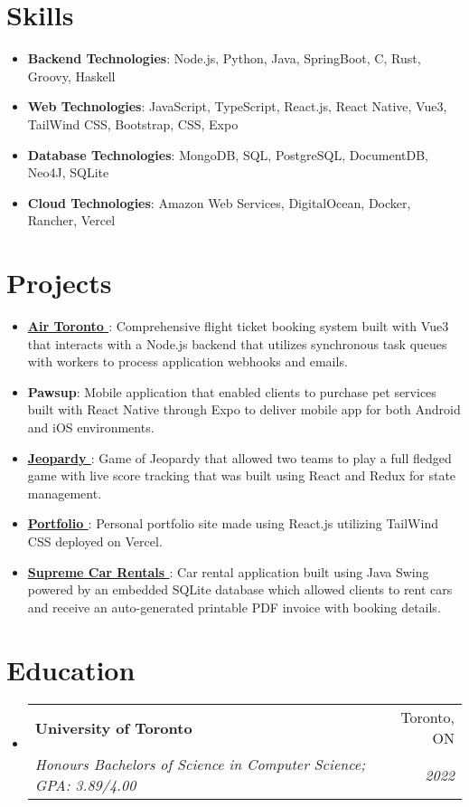 \documentclass[letterpaper,11pt]{article}
\makeatletter
\newcommand{\resumeItem}[2]{
  \item\small{
    \textbf{#1}{: #2 \vspace{0pt}}
  }
}
\newcommand{\resumeSubheading}[4]{
  \vspace{-1pt}\item
    \begin{tabular*}{0.97\textwidth}{l@{\extracolsep{\fill}}r}
      \textbf{#1} & #2 \\
      \textit{\small#3} & \textit{\small #4} \\
    \end{tabular*}\vspace{-2pt}
}
\newcommand{\resumeSubItem}[2]{\resumeItem{#1}{#2}\vspace{-2pt}}
\newcommand{\resumeSubHeadingListStart}{\begin{itemize}[leftmargin=*]}
\newcommand{\resumeSubHeadingListEnd}{\end{itemize}}
\makeatother
\begin{document}
\section{Skills}
 \resumeSubHeadingListStart
 	\resumeSubItem{Backend Technologies}{Node.js, Python, Java, SpringBoot, C, Rust, Groovy, Haskell}
 	\resumeSubItem{Web Technologies}{JavaScript, TypeScript, React.js, React Native, Vue3, TailWind CSS, Bootstrap, CSS, Expo }
 	\resumeSubItem{Database Technologies}{MongoDB, SQL, PostgreSQL, DocumentDB, Neo4J, SQLite}
 	\resumeSubItem{Cloud Technologies}{Amazon Web Services, DigitalOcean, Docker, Rancher, Vercel }
 \resumeSubHeadingListEnd

\section{Projects}
  \resumeSubHeadingListStart
  	\resumeSubItem{\href{https://github.com/UTSCC09/project-frontend-frauds}{Air Toronto \faIcon{github}}}{Comprehensive flight ticket booking system built with Vue3 that interacts with a Node.js backend that utilizes synchronous task queues with workers to process application webhooks and emails.}
  	\resumeSubItem{Pawsup}{Mobile application that enabled clients to purchase pet services built with React Native through Expo to deliver mobile app for both Android and iOS environments.}
    \resumeSubItem{\href{https://github.com/payamyek/Jeopardy}{Jeopardy \faIcon{github}}}
      {Game of Jeopardy that allowed two teams to play a full fledged game with live score tracking that was built using React and Redux for state management.}
     \resumeSubItem{\href{https://github.com/payamyek/portfolio-site}{Portfolio \faIcon{github}}}
      {Personal portfolio site made using React.js utilizing TailWind CSS deployed on Vercel.}
    \resumeSubItem{\href{https://github.com/payamyek/SupremeCarRentals}{Supreme Car Rentals \faIcon{github}}}
      {Car rental application built using Java Swing powered by an embedded SQLite database which allowed clients to rent cars and receive an auto-generated printable PDF invoice with booking details.}
      
  \resumeSubHeadingListEnd

\section{Education}
  \resumeSubHeadingListStart
    \resumeSubheading
      {University of Toronto}{Toronto, ON}
      {Honours Bachelors of Science in Computer Science;  GPA: 3.89/4.00}{2022}
 \resumeSubHeadingListEnd
 
\end{document}
